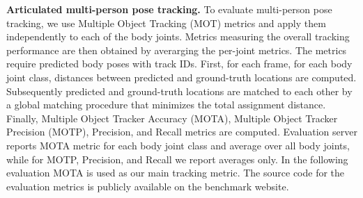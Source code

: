 \documentclass[10pt,twocolumn,letterpaper]{article}
\newcommand{\myparagraph}[1]{\vspace{0.1em}\noindent\textbf{#1}}
\begin{document}
\myparagraph{Articulated multi-person pose tracking.}  To evaluate multi-person
pose tracking, we use Multiple Object Tracking (MOT) metrics
\cite{Milan:2016:MOT16} and apply them independently to each of the body
joints. Metrics measuring the overall tracking performance are then obtained by
averarging the per-joint metrics. 
The metrics require predicted body poses with track IDs. First, for each frame,
for each body joint class, distances between predicted and ground-truth locations are computed. 
Subsequently predicted and ground-truth locations are matched to each other
by a global matching procedure that minimizes the total assignment distance.
Finally, Multiple Object Tracker Accuracy (MOTA), Multiple Object
Tracker Precision (MOTP), Precision, and Recall metrics are computed. Evaluation
server reports MOTA metric for each body joint class and average over all body
joints, while for MOTP, Precision, and Recall we report averages only. In the
following evaluation MOTA is used as our main tracking metric.
The source code for the evaluation metrics is publicly available on the
benchmark website.
\end{document}
